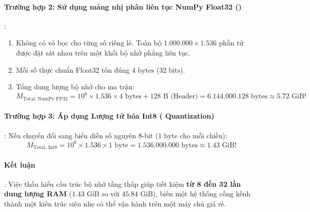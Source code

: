 \begin{example}
\paragraph{Trường hợp 2: Sử dụng mảng nhị phân liên tục NumPy Float32 ()}:
\begin{enumerate}
  \item Không có vỏ bọc  cho từng số riêng lẻ. Toàn bộ $1.000.000 \times 1.536$ phần tử được đặt sát nhau trên một khối bộ nhớ phẳng liên tục.
  \item Mỗi số thực chuẩn Float32 tốn đúng $4\text{ bytes}$ ($32\text{ bits}$).
  \item Tổng dung lượng bộ nhớ cho ma trận:
  \begin{equation*}
  M_{\text{Total, NumPy FP32}} = 10^6 \times 1.536 \times 4\text{ bytes} + 128\text{ B (Header)} = 6.144.000.128\text{ bytes} \approx 5.72\text{ GiB}!
  \end{equation*}
\end{enumerate}

\paragraph{Trường hợp 3: Áp dụng Lượng tử hóa Int8 ( Quantization)}:
Nếu chuyển đổi sang biểu diễn số nguyên 8-bit ($1\text{ byte}$ cho mỗi chiều):
\begin{equation*}
M_{\text{Total, Int8}} = 10^6 \times 1.536 \times 1\text{ byte} = 1.536.000.000\text{ bytes} \approx 1.43\text{ GiB}!
\end{equation*}

\paragraph{Kết luận}: Việc thấu hiểu cấu trúc bộ nhớ tầng thấp giúp tiết kiệm \textbf{từ 8 đến 32 lần dung lượng RAM} ($1.43\text{ GiB}$ so với $45.84\text{ GiB}$), biến một hệ thống cồng kềnh thành một kiến trúc siêu nhẹ có thể vận hành trên một máy chủ giá rẻ.
\end{example}

